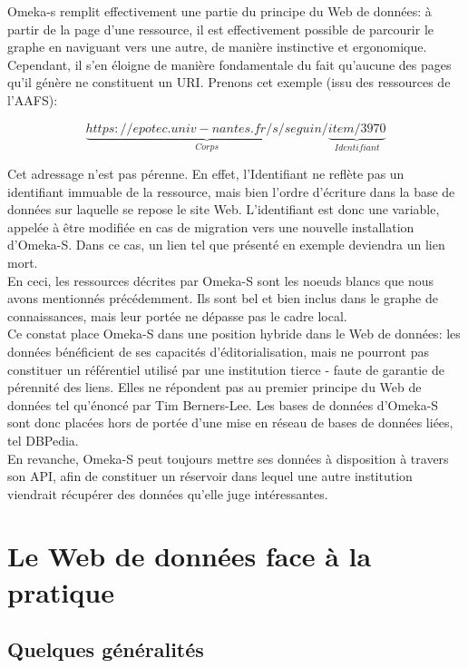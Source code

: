 \documentclass[a4paper,12pt,twoside]{book}
\begin{document}
Omeka-s remplit effectivement une partie du principe du Web de données: à partir de la page d'une ressource, il est effectivement possible de \og parcourir le graphe \fg{} en naviguant vers une autre, de manière instinctive et ergonomique. Cependant, il s'en éloigne de manière fondamentale du fait qu'aucune des pages qu'il génère ne constituent un URI. Prenons cet exemple (issu des ressources de l'AAFS):

\large
$$
\underbrace{https://epotec.univ-nantes.fr/s/seguin/}_{Corps}\underbrace{item/3970}_{Identifiant}
$$
\normalsize

Cet adressage n'est pas pérenne. En effet, l'\og Identifiant \fg{} ne reflète pas un identifiant immuable de la ressource, mais bien l'ordre d'écriture dans la base de données sur laquelle se repose le site Web. L'identifiant est donc une variable, appelée à être modifiée en cas de migration vers une nouvelle installation d'Omeka-S. Dans ce cas, un lien tel que présenté en exemple deviendra un lien mort.\\

En ceci, les ressources décrites par Omeka-S sont les \og noeuds blancs \fg{} que nous avons mentionnés précédemment. Ils sont bel et bien inclus dans le graphe de connaissances, mais leur portée ne dépasse pas le cadre local.\\

Ce constat place Omeka-S dans une position hybride dans le Web de données: les données bénéficient de ses capacités d'éditorialisation, mais ne pourront pas constituer un référentiel utilisé par une institution tierce - faute de garantie de pérennité des liens. Elles ne répondent pas au premier principe du Web de données tel qu'énoncé par Tim Berners-Lee. Les bases de données d'Omeka-S sont donc placées hors de portée d'une mise en réseau de bases de données liées, tel DBPedia.\\

En revanche, Omeka-S peut toujours mettre ses données à disposition à travers son API, afin de constituer un réservoir dans lequel une autre institution viendrait récupérer des données qu'elle juge intéressantes. 




\chapter{Le Web de données face à la pratique}


\section{Quelques généralités}
\end{document}
